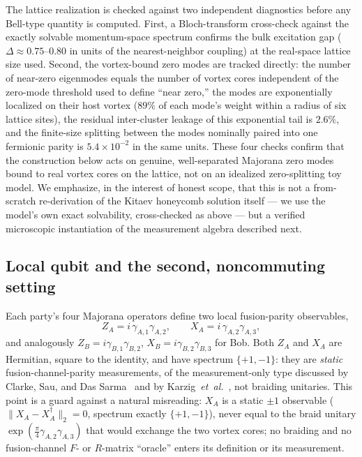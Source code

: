 \documentclass[aps,pra,twocolumn,superscriptaddress,floatfix,nofootinbib]{revtex4-2}
\begin{document}
The lattice realization is checked against two independent
diagnostics before any Bell-type quantity is computed. First, a
Bloch-transform cross-check against the exactly solvable momentum-space
spectrum confirms the bulk excitation gap ($\Delta\approx0.75$--$0.80$
in units of the nearest-neighbor coupling) at the real-space lattice
size used. Second, the vortex-bound zero modes are tracked directly:
the number of near-zero eigenmodes equals the number of vortex cores
independent of the zero-mode threshold used to define ``near
zero,'' the modes are exponentially localized on their host vortex
($89\%$ of each mode's weight within a radius of six lattice
sites), the residual inter-cluster leakage of this exponential tail is
$2.6\%$, and the finite-size splitting between the modes nominally
paired into one fermionic parity is $5.4\times10^{-2}$ in the same
units. These four checks confirm that the construction below acts on
genuine, well-separated Majorana zero modes bound to real vortex
cores on the lattice, not on an idealized zero-splitting toy model. We
emphasize, in the interest of honest scope, that this is not a
from-scratch re-derivation of the Kitaev honeycomb solution itself
--- we use the model's own exact solvability, cross-checked as above
--- but a verified microscopic instantiation of the measurement
algebra described next.

\subsection{Local qubit and the second, noncommuting setting}
\label{sec:algebra}

Each party's four Majorana operators define two local fusion-parity
observables,
\begin{equation}
\label{eq:ZAXA}
Z_A = i\,\gamma_{A,1}\gamma_{A,2}, \qquad
X_A = i\,\gamma_{A,2}\gamma_{A,3},
\end{equation}
and analogously $Z_B=i\gamma_{B,1}\gamma_{B,2}$,
$X_B=i\gamma_{B,2}\gamma_{B,3}$ for Bob. Both $Z_A$ and $X_A$ are
Hermitian, square to the identity, and have spectrum $\{+1,-1\}$: they
are \emph{static} fusion-channel-parity measurements, of the
measurement-only type discussed by Clarke, Sau, and Das
Sarma~\cite{ClarkeSauDasSarma2016} and by
Karzig~\emph{et~al.}~\cite{Karzig2017}, not braiding unitaries. This
point is a guard against a natural misreading: $X_A$ is a static
$\pm1$ observable ($\lVert X_A-X_A^\dagger\rVert_2=0$, spectrum exactly
$\{+1,-1\}$), never equal to the braid unitary
$\exp(\tfrac{\pi}{4}\gamma_{A,2}\gamma_{A,3})$ that would exchange the
two vortex cores; no braiding and no fusion-channel $F$- or
$R$-matrix ``oracle'' enters its definition or its measurement.
\end{document}
